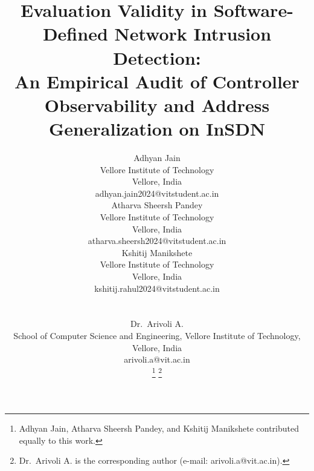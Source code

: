 \documentclass[journal]{IEEEtran}
\begin{document}
\title{Evaluation Validity in Software-Defined Network Intrusion Detection:\\An Empirical Audit of Controller Observability and Address Generalization on InSDN}

\author{%
\parbox[t]{0.32\textwidth}{\centering
{\large Adhyan Jain}\\[2pt]
{\small Vellore Institute of Technology\\Vellore, India}\\[2pt]
{\footnotesize adhyan.jain2024@vitstudent.ac.in}}\hfill
\parbox[t]{0.32\textwidth}{\centering
{\large Atharva Sheersh Pandey}\\[2pt]
{\small Vellore Institute of Technology\\Vellore, India}\\[2pt]
{\footnotesize atharva.sheersh2024@vitstudent.ac.in}}\hfill
\parbox[t]{0.32\textwidth}{\centering
{\large Kshitij Manikshete}\\[2pt]
{\small Vellore Institute of Technology\\Vellore, India}\\[2pt]
{\footnotesize kshitij.rahul2024@vitstudent.ac.in}}\\[10pt]
\parbox[t]{\textwidth}{\centering
{\large Dr.~Arivoli A.}\\[2pt]
{\small School of Computer Science and Engineering, Vellore Institute of Technology, Vellore, India}\\[2pt]
{\footnotesize arivoli.a@vit.ac.in}}%
\thanks{Adhyan Jain, Atharva Sheersh Pandey, and Kshitij Manikshete contributed equally to this work.}%
\thanks{Dr.~Arivoli A. is the corresponding author (e-mail: arivoli.a@vit.ac.in).}}

\maketitle
\end{document}

